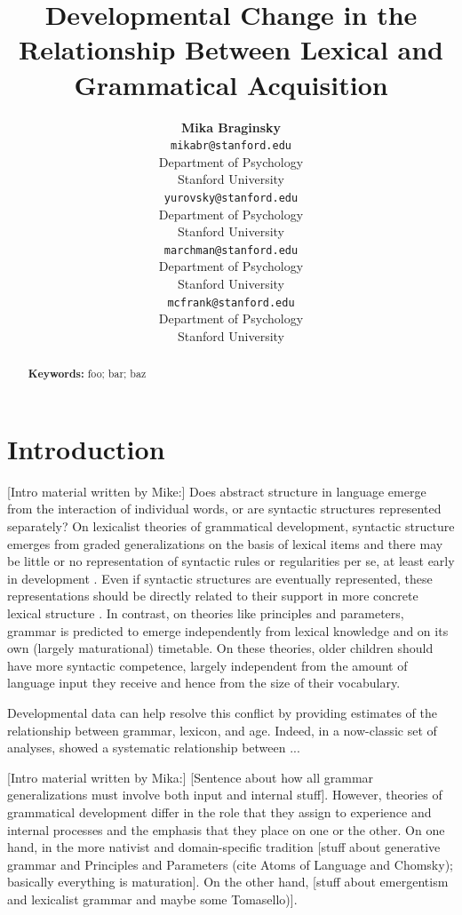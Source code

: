 \documentclass[10pt,letterpaper]{article}
\title{Developmental Change in the Relationship Between Lexical and Grammatical Acquisition}
\author{{\large \bf Mika Braginsky} \\
  \texttt{mikabr@stanford.edu} \\
  Department of Psychology \\
  Stanford University
  \And {\large \bf Daniel Yurovsky} \\
  \texttt{yurovsky@stanford.edu} \\
  Department of Psychology \\
  Stanford University
    \And {\large \bf Virginia Marchman} \\
    \texttt{marchman@stanford.edu} \\
  Department of Psychology \\
  Stanford University
    \And {\large \bf Michael C. Frank}\\
    \texttt{mcfrank@stanford.edu} \\
  Department of Psychology \\
  Stanford University}
\begin{document}
\maketitle

\begin{abstract}
\lipsum[1]

\textbf{Keywords:} 
foo; bar; baz
\end{abstract}

\section{Introduction}

[Intro material written by Mike:]
Does abstract structure in language emerge from the interaction of individual words, or are syntactic structures represented separately? On lexicalist theories of grammatical development, syntactic structure emerges from graded generalizations on the basis of lexical items and there may be little or no representation of syntactic rules or regularities per se, at least early in development \cite{tomasello2001,tomasello2003}. Even if syntactic structures are eventually represented, these representations should be directly related to their support in more concrete lexical structure \cite{bannard2009,bod2010}. In contrast, on theories like principles and parameters, grammar is predicted to emerge independently from lexical knowledge and on its own (largely maturational) timetable. On these theories, older children should have more syntactic competence, largely independent from the amount of language input they receive and hence from the size of their vocabulary.

Developmental data can help resolve this conflict by providing estimates of the relationship between grammar, lexicon, and age. Indeed, in a now-classic set of analyses, \cite{bates1994} showed a systematic relationship between ...

[Intro material written by Mika:]
[Sentence about how all grammar generalizations must involve both input and internal stuff]. However, theories of grammatical development differ in the role that they assign to experience and internal processes and the emphasis that they place on one or the other. On one hand, in the more nativist and domain-specific tradition [stuff about generative grammar and Principles and Parameters (cite Atoms of Language and Chomsky); basically everything is maturation]. On the other hand, [stuff about emergentism and lexicalist grammar \cite{bates1999} and maybe some Tomasello)].
\end{document}
